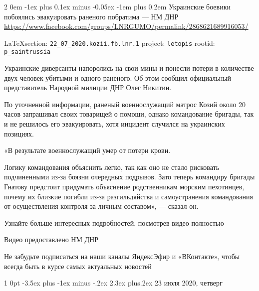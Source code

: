 \documentclass[a4paper,11pt]{extreport}
\makeatletter
\renewcommand\section{%
  \clearpage
  \@startsection{section}%
    {1}%
    {0pt}%
    {-3.5ex plus -1ex minus -.2ex}%
    {2.3ex plus.2ex}%
    {\centering\normalfont\Huge\bfseries}%
}
\renewcommand\subsection{%
  \clearpage
    \@startsection{subsection}%
    {2}%
    {0em}%
    {-1ex plus 0.1ex minus -0.05ex}%
    {-1em plus 0.2em}%
    {\scshape\bfseries\Large}%
}
\makeatother
\begin{document}
 
\subsection{Украинские боевики побоялись эвакуировать раненого побратима --- НМ ДНР}
\label{sec:22_07_2020.kozii.fb.lnr.1}
\url{https://www.facebook.com/groups/LNRGUMO/permalink/2868621689916053/}
  
\vspace{0.5cm}
{\small\LaTeX section: \verb|22_07_2020.kozii.fb.lnr.1| project: \verb|letopis| rootid: \verb|p_saintrussia|}
\vspace{0.5cm}

 
Украинские диверсанты напоролись на свои мины и понесли потери в количестве
двух человек убитыми и одного раненого.  Об этом сообщил официальный
представитель Народной милиции ДНР Олег Никитин.

По уточненной информации, раненый военнослужащий матрос Козий около 20 часов
запрашивал своих товарищей о помощи, однако командование бригады, так и не
решилось его эвакуировать, хотя инцидент случился на украинских позициях.

«В результате военнослужащий умер от потери крови.

Логику командования объяснить легко, так как оно не стало рисковать
подчиненными из-за боязни очередных подрывов. Зато теперь командиру бригады
Гнатову предстоит придумать объяснение родственникам морским пехотинцев, почему
их близкие погибли из-за разгильдяйства и самоустранения командования от
осуществления контроля за личным составом», --- сказал он.

Узнайте больше интересных подробностей, посмотрев видео полностью

Видео предоставлено НМ ДНР

Не забудьте подписаться на наши каналы ЯндексЭфир и «ВКонтакте», чтобы всегда
быть в курсе самых актуальных новостей
  

 
 

\clearpage
\section{23 июля 2020, четверг}
\label{sec:23_07_2020}
  
\end{document}
